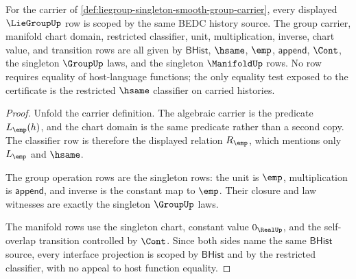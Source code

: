 \begin{theorem}
\label{thm:liegroup-singleton-shared-source-scope}
For the carrier of
\autoref{def:liegroup-singleton-smooth-group-carrier}, every displayed
$\LieGroupUp$ row is scoped by the same BEDC history source. The group carrier,
manifold chart domain, restricted classifier, unit, multiplication, inverse,
chart value, and transition rows are all given by $\mathsf{BHist}$, $\hsame$,
$\emp$, $\mathsf{append}$, $\Cont$, the singleton $\GroupUp$ laws, and the
singleton $\ManifoldUp$ rows. No row requires equality of host-language
functions; the only equality test exposed to the certificate is the restricted
$\hsame$ classifier on carried histories.
\end{theorem}
\begin{proof}
Unfold the carrier definition. The algebraic carrier is the predicate
$L_{\emp}(h)$, and the chart domain is the same predicate rather than a second
copy. The classifier row is therefore the displayed relation $R_{\emp}$, which
mentions only $L_{\emp}$ and $\hsame$.

The group operation rows are the singleton rows: the unit is $\emp$,
multiplication is $\mathsf{append}$, and inverse is the constant map to $\emp$.
Their closure and law witnesses are exactly the singleton $\GroupUp$ laws.

The manifold rows use the singleton chart, constant value $0_{\RealUp}$, and
the self-overlap transition controlled by $\Cont$. Since both sides name the
same $\mathsf{BHist}$ source, every interface projection is scoped by
$\mathsf{BHist}$ and by the restricted classifier, with no appeal to host
function equality.
\end{proof}


